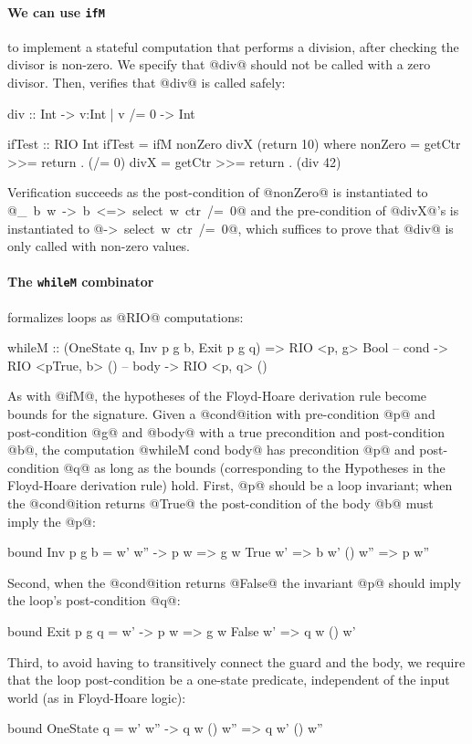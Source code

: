 \paragraph{We can use \texttt{ifM}} to implement a stateful 
computation that performs a division, after checking 
the divisor is non-zero.
%
We specify that @div@ should not be called with a zero divisor. 
Then, \toolname verifies that @div@ is called safely:
%
\begin{code}
  div :: Int -> {v:Int | v /= 0} -> Int

  ifTest :: RIO Int
  ifTest = ifM nonZero divX (return 10)
    where nonZero = getCtr >>= return . (/= 0)
          divX    = getCtr >>= return . (div 42)
\end{code}
%
Verification succeeds as the post-condition of @nonZero@
is instantiated to 
\hbox{@\_ b w -> b <=> select w ctr /= 0@}
and the pre-condition of @divX@'s is instantiated to
\hbox{@\w -> select w ctr /= 0@}, which suffices to 
prove that @div@ is only called with non-zero values.

\paragraph{The \texttt{whileM} combinator} 
formalizes loops as @RIO@ computations:
%
\begin{code}
  whileM :: (OneState q, Inv p g b, Exit p g q)  
         => RIO <p, g> Bool      -- cond 
         -> RIO <pTrue, b> ()    -- body
         -> RIO <p, q> ()
\end{code}
%
As with @ifM@, the hypotheses of the Floyd-Hoare derivation rule
become bounds for the signature.
%
Given a @cond@ition with pre-condition @p@ and 
post-condition @g@ and @body@ with a true 
precondition and post-condition @b@, the computation 
@whileM cond body@ has precondition @p@ and post-condition 
@q@ as long as the bounds (corresponding to the Hypotheses
in the Floyd-Hoare derivation rule) hold.
%
First, @p@ should be a loop invariant; \ie when 
the @cond@ition returns @True@ the post-condition 
of the body @b@ must imply the @p@:
%
\begin{code}
  bound Inv p g b = \w w' w'' ->
      p w => g w True w' => b w' () w'' => p w'' 
\end{code}
%
Second, when the @cond@ition returns @False@ the invariant @p@
should imply the loop's post-condition @q@:
%
\begin{code}
  bound Exit p g q = \w w' ->
        p w => g w False w' => q w () w'
\end{code}
%
Third, to avoid having to transitively connect the guard and the body,
we require that the loop post-condition be a one-state predicate,
independent of the input world (as in Floyd-Hoare logic):
%
\begin{code}
  bound OneState q = \w w' w'' ->
        q w () w'' => q w' () w''
\end{code}

